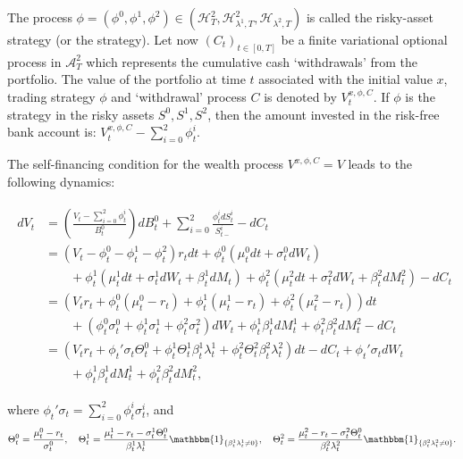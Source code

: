 \documentclass[11pt,a4paper]{article}
\numberwithin{equation}{section}
\theoremstyle{newPlain}
\theoremstyle{newDefinition}
\theoremstyle{newRemark}
\begin{document}
The process $\phi = (\phi^0,\phi^1,\phi^2)\in(\mathcal{H}_T^2,\mathcal{H}_{\lambda^1,T}^2,\mathcal{H}_{\lambda^2,T})$ is called the risky-asset strategy (or the strategy). Let now $(C_t)_{t\in[0,T]}$ be a finite variational optional process in $\mathcal{A}_T^2$ which represents the cumulative  cash `withdrawals' from the portfolio. The value of the portfolio at time $t$ associated with the initial value $x$, trading strategy $\phi$ and `withdrawal' process $C$ is denoted by $V_t^{x,\phi,C}$. If $\phi$ is the strategy in the risky assets $S^0, S^1, S^2$, then the amount invested in the risk-free bank account is: $V_t^{x,\phi,C}-\sum_{i=0}^2\phi^i_t$.


The self-financing condition for the wealth process $V^{x,\phi,C}=V$ leads to the following dynamics:

\begin{align}\label{eq:3_SFC}
    \begin{aligned}
        dV_t &= \left(\frac{V_t-\sum_{i=0}^2\phi_t^i}{B_t^0}\right)dB_t^0 + \sum_{i=0}^2\frac{\phi_t^idS_t^i}{S_{t-}^i} - dC_t\\
        &=(V_t-\phi_t^0-\phi_t^1-\phi_t^2)r_tdt + \phi_t^0(\mu_t^0dt+\sigma_t^0dW_t) \\&\quad\quad+ \phi_t^1(\mu_t^1dt+\sigma_t^1dW_t+\beta_t^1dM_t) + \phi_t^2(\mu_t^2dt+\sigma_t^2dW_t+\beta_t^2dM_t^2) - dC_t\\
        &=(V_tr_t+\phi_t^0(\mu_t^0-r_t) + \phi_t^1(\mu_t^1-r_t)+\phi_t^2(\mu_t^2-r_t))dt\\
        &\quad\quad+(\phi_t^0\sigma_t^0+\phi_t^1\sigma_t^1+\phi_t^2\sigma_t^2)dW_t + \phi_t^1\beta_t^1dM_t^1+\phi_t^2\beta_t^2dM_t^2 - dC_t\\
        &=(V_tr_t + \phi_t'\sigma_t\Theta_t^0+\phi_t^1\Theta_t^1\beta_t^1\lambda_t^1 + \phi_t^2\Theta_t^2\beta_t^2\lambda_t^2)dt - dC_t + \phi_t'\sigma_tdW_t \\
	 &\quad\quad+ \phi_t^1\beta_t^1dM_t^1 + \phi_t^2\beta_t^2dM_t^2,
    \end{aligned}
\end{align}

where $\phi_t'\sigma_t = \sum_{i=0}^2\phi_t^i\sigma_t^i$, and
\begin{equation*}
    \Theta_t^0 = \frac{\mu_t^0-r_t}{\sigma_t^0},\quad\Theta_t^1=\frac{\mu_t^1-r_t-\sigma_t^1\Theta_t^0}{\beta_t^1\lambda_t^1}\mathbbm{1}_{\{\beta_t^1\lambda_t^1\ne0\}},\quad\Theta_t^2=\frac{\mu_t^2-r_t-\sigma_t^2\Theta_t^0}{\beta_t^2\lambda_t^2}\mathbbm{1}_{\{\beta_t^2\lambda_t^2\ne0\}}.
\end{equation*}
\end{document}
